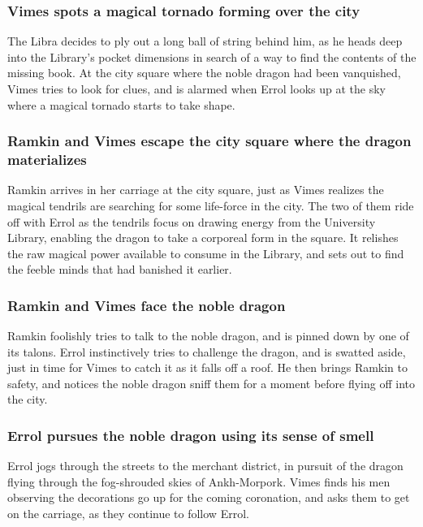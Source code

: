 \subsubsection{\Gls{Vimes} spots a magical tornado forming over the city}
The \Gls{Libra} decides to ply out a long ball of string behind him, as he heads deep into the
Library's pocket dimensions in search of a way to find the contents of the missing book. At the
city square where the noble dragon had been vanquished, \Gls{Vimes} tries to look for clues, and is
alarmed when \Gls{Errol} looks up at the sky where a magical tornado starts to take shape.

\subsubsection{\Gls{Ramkin} and \Gls{Vimes} escape the city square where the dragon materializes}
\Gls{Ramkin} arrives in her carriage at the city square, just as \Gls{Vimes} realizes the magical
tendrils are searching for some life-force in the city. The two of them ride off with \Gls{Errol}
as the tendrils focus on drawing energy from the University Library, enabling the dragon to take a
corporeal form in the square. It relishes the raw magical power available to consume in the Library,
and sets out to find the feeble minds that had banished it earlier.

\subsubsection{\Gls{Ramkin} and \Gls{Vimes} face the noble dragon}
\Gls{Ramkin} foolishly tries to talk to the noble dragon, and is pinned down by one of its talons.
\Gls{Errol} instinctively tries to challenge the dragon, and is swatted aside, just in time for
\Gls{Vimes} to catch it as it falls off a roof. He then brings \Gls{Ramkin} to safety, and notices
the noble dragon sniff them for a moment before flying off into the city.

\subsubsection{\Gls{Errol} pursues the noble dragon using its sense of smell}
\Gls{Errol} jogs through the streets to the merchant district, in pursuit of the dragon flying
through the fog-shrouded skies of Ankh-Morpork. \Gls{Vimes} finds his men observing the decorations
go up for the coming coronation, and asks them to get on the carriage, as they continue to follow
\Gls{Errol}.

